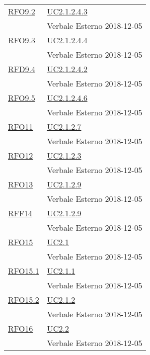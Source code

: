 \begin{longtable}{|>{\centering}m{5cm}|m{5cm}<{\centering}|}
	\hyperlink{RFO9.2}{RFO9.2} & \hyperref[UC2.1.2.4.3]{UC2.1.2.4.3}\\ & Verbale Esterno 2018-12-05\\ \hline
	
	\hyperlink{RFO9.3}{RFO9.3} & \hyperref[UC2.1.2.4.4]{UC2.1.2.4.4}\\ & Verbale Esterno 2018-12-05\\ \hline
	
	\hyperlink{RFD9.4}{RFD9.4} & \hyperref[UC2.1.2.4.2]{UC2.1.2.4.2}\\ & Verbale Esterno 2018-12-05\\ \hline
	
	\hyperlink{RFO9.5}{RFO9.5} & \hyperref[UC2.1.2.4.6]{UC2.1.2.4.6}\\ & Verbale Esterno 2018-12-05\\ \hline
	
	\hyperlink{RFO11}{RFO11} & \hyperref[UC2.1.2.7]{UC2.1.2.7}\\ & Verbale Esterno 2018-12-05\\ \hline
	
	\hyperlink{RFO12}{RFO12} & \hyperref[UC2.1.2.3]{UC2.1.2.3}\\ & Verbale Esterno 2018-12-05\\ \hline
	
	\hyperlink{RFO13}{RFO13} & \hyperref[UC2.1.2.9]{UC2.1.2.9}\\ & Verbale Esterno 2018-12-05\\ \hline
	
	\hyperlink{RFF14}{RFF14} & \hyperref[UC2.1.2.9]{UC2.1.2.9}\\ & Verbale Esterno 2018-12-05\\ \hline
	
	\hyperlink{RFO15}{RFO15} & \hyperref[UC2.1]{UC2.1}\\ & Verbale Esterno 2018-12-05\\ \hline
	
	\hyperlink{RFO15.1}{RFO15.1} & \hyperref[UC2.1.1]{UC2.1.1}\\ & Verbale Esterno 2018-12-05\\ \hline
	
	\hyperlink{RFO15.2}{RFO15.2} & \hyperref[UC2.1.2]{UC2.1.2}\\ & Verbale Esterno 2018-12-05\\ \hline
	
	\hyperlink{RFO16}{RFO16} & \hyperref[UC2.2]{UC2.2}\\ & Verbale Esterno 2018-12-05\\ \hline
	

\end{longtable}
